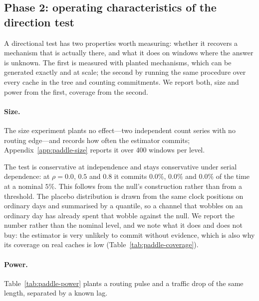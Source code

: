\subsection{Phase 2: operating characteristics of the direction test}
\label{sec:eval-direction}

A directional test has two properties worth measuring: whether it recovers
a mechanism that is actually there, and what it does on windows where the
answer is unknown. The first is measured with planted mechanisms, which can
be generated exactly and at scale; the second by running the same procedure
over every cache in the tree and counting commitments. We report both, size
and power from the first, coverage from the second.

\paragraph{Size.} The size experiment plants no effect---two
independent count series with no routing edge---and records how often the
estimator commits; Appendix~\ref{app:paddle-size} reports it over 400
windows per level.

The test is conservative at independence and stays conservative under
serial dependence: at $\rho=0.0$, $0.5$ and $0.8$ it commits $0.0\%$,
$0.0\%$ and $0.0\%$ of the time at a nominal $5\%$. This follows from
the null's construction rather than from a threshold. The placebo
distribution is drawn from the same clock positions on ordinary days and
summarised by a quantile, so a channel that wobbles on an ordinary day has
already spent that wobble against the null. We report the number rather
than the nominal level, and we note what it does and does not buy: the
estimator is very unlikely to commit without evidence, which is also why
its coverage on real caches is low (Table~\ref{tab:paddle-coverage}).

\paragraph{Power.} Table~\ref{tab:paddle-power} plants a routing pulse and a
traffic drop of the same length, separated by a known lag.

